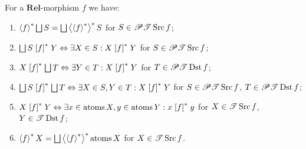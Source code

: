 \begin{cor}
For a $\mathbf{Rel}$-morphism $f$ we have:
\begin{enumerate}
\item $\rsupfun f\bigsqcup S=\bigsqcup\rsupfun{\rsupfun f}S$ for $S\in\subsets\mathscr{T}\Src f$;
\item $\bigsqcup S\rsuprel fY\Leftrightarrow\exists X\in S:X\rsuprel fY$
for $S\in\subsets\mathscr{T}\Src f$;
\item $X\rsuprel f\bigsqcup T\Leftrightarrow\exists Y\in T:X\rsuprel fY$
for $T\in\subsets\mathscr{T}\Dst f$;
\item $\bigsqcup S\rsuprel f\bigsqcup T\Leftrightarrow\exists X\in S,Y\in T:X\rsuprel fY$
for $S\in\subsets\mathscr{T}\Src f$, $T\in\subsets\mathscr{T}\Dst f$;
\item $X\rsuprel fY\Leftrightarrow\exists x\in\atoms X,y\in\atoms Y:x\rsuprel fy$
for $X\in\mathscr{T}\Src f$, $Y\in\mathscr{T}\Dst f$;
\item $\rsupfun fX=\bigsqcup\rsupfun{\rsupfun f}\atoms X$ for $X\in\mathscr{T}\Src f$.
\end{enumerate}
\end{cor}

